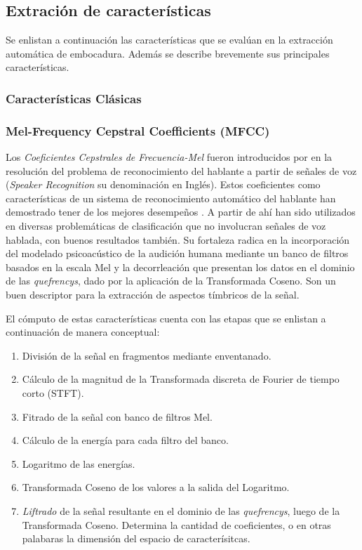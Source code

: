 \documentclass{article}
\begin{document}
\subsection{Extración de características}
Se enlistan a continuación las características que se evalúan en la extracción automática de embocadura. Además se describe brevemente sus principales características.

\subsubsection{Características Clásicas} 



\subsubsection{Mel-Frequency Cepstral Coefficients (MFCC) \citep{davis1980comparison}}  

Los \textit{Coeficientes Cepstrales de Frecuencia-Mel} fueron introducidos por \cite{davis1980comparison} en la resolución del problema de reconocimiento del hablante a partir de señales de voz (\textit{Speaker Recognition} su denominación en Inglés). Estos coeficientes como características de un sistema de reconocimiento automático del hablante han demostrado tener de los mejores desempeños \citep[Capítulo~14]{quatieri2002discrete}. A partir de ahí han sido utilizados en diversas problemáticas de clasificación que no involucran señales de voz hablada, con buenos resultados también. Su fortaleza radica en la incorporación del modelado psicoacústico de la audición humana mediante un banco de filtros basados en la escala Mel \citep{stevens1937scale} y la decorrleación que presentan los datos en el dominio de las \textit{quefrencys}, dado por la aplicación de la Transformada Coseno. Son un buen descriptor para la extracción de aspectos tímbricos de la señal.
\medskip

El cómputo de estas características cuenta con las etapas que se enlistan a continuación de manera conceptual: 

\begin{enumerate}
	\item División de la señal en fragmentos mediante enventanado.
	\item Cálculo de la magnitud de la Transformada discreta de Fourier de tiempo corto (STFT).
	\item Fitrado de la señal con banco de filtros Mel.
	\item Cálculo de la energía para cada filtro del banco.
	\item Logaritmo de las energías.
	\item Transformada Coseno de los valores a la salida del Logaritmo.
	\item \textit{Liftrado} de la señal resultante en el dominio de las \textit{quefrencys}, luego de la Transformada Coseno. Determina la cantidad de coeficientes, o en otras palabaras la dimensión del espacio de caracterísitcas.
\end{enumerate}
\end{document}
